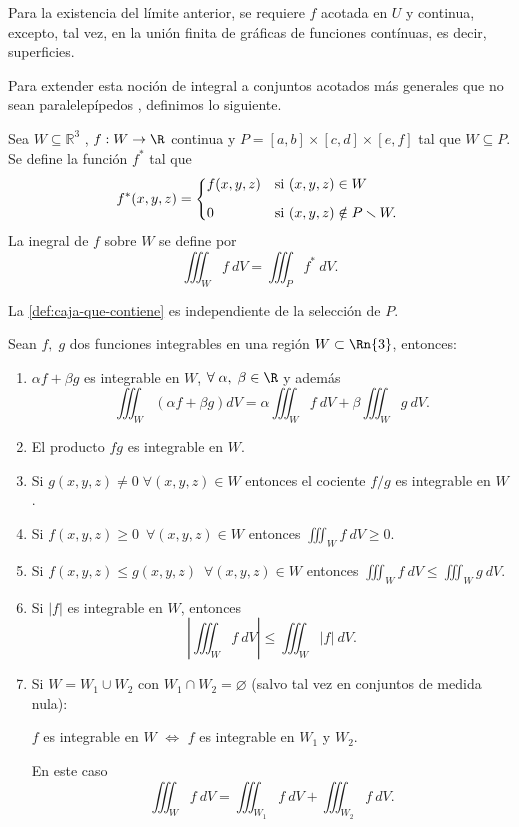 \begin{obs}
Para la existencia del límite anterior, se requiere $f$ acotada en $U$ y continua, excepto, tal vez, en la unión finita de gráficas de funciones 
contínuas, es decir, superficies.
\end{obs}


Para extender esta noci\'on de integral a  conjuntos acotados m\'as generales que no sean  paralelepípedos , definimos lo siguiente. 

\begin{definition}\label{def:caja-que-contiene} Sea $W  \subseteq  \mathbb{R}^3$ , $f:W\to\R$ continua y  $P = [a, b] \times [c, d] \times [e, f]$ tal que $W  \subseteq  P$.  Se define la funci\'on $f^*$ tal que
\[
    f^*(x,y,z)=
    \begin{dcases*}
        f(x,y,z) & si $(x,y,z)\in W$ \\[.2cm]
        0        & si $(x,y,z)\notin P\smallsetminus W.$
    \end{dcases*}
\]
La inegral de  $f$ sobre $W$ se define por 
\[
    \iiint_W f\:dV=\iiint_P f^*\:dV.  
\]
\end{definition}

\begin{obs} 
   La \autoref{def:caja-que-contiene} es independiente de la selecci\'on de $P$.
\end{obs}

\begin{propertie}
    Sean $f,\;g$ dos funciones integrables en una regi\'on $W\subset\Rn{3}$, entonces:
    \begin{enumerate}
        \item[i.] $\alpha f+\beta g$ es integrable en $W$, $\forall\;\alpha,\;\beta\in\R$ y adem\'as
        \[
            \iiint_W \left(\alpha f+\beta g\right)dV=\alpha\iiint_W f\:dV+\beta\iiint_W g\:dV.
        \]
        \item[ii.] El producto $fg$ es integrable en $W$.
        \item[iii.] Si $g(x,y,z) \neq  0\;\forall(x,y,z)\in W$ entonces el cociente $f/g$ es integrable en $W$.
        \item[iv.] Si $f(x,y,z) \geq 0  \;\: \forall(x,y,z)\in W$ entonces  $\iiint_W f\:dV\geq0$.
        \item[v.]Si $f(x,y,z) \leq g(x,y,z) \;\: \forall(x,y,z)\in W$ entonces $\iiint_W f\:dV\leq\iiint_W g\:dV.$
        \item[vi.]Si $|f|$ es integrable en $W$, entonces 
        \[
            \left|\iiint_W f\:dV\right|\leq\iiint_W|f|\:dV.  
        \]    
        \item[vii.] Si $W=W_1\cup W_2$  con $W_1\cap W_2 = \varnothing$  (salvo tal vez en conjuntos de medida nula): 
        
        $f$ es integrable en $W$ $\iff$ $f$ es integrable en $W_1$ y $W_2$.
        
         En este caso 
        \[
            \iiint_W f\:dV=\iiint_{W_1} f\:dV+\iiint_{W_2}f\:dV.    
        \]
    \end{enumerate}
\end{propertie}

